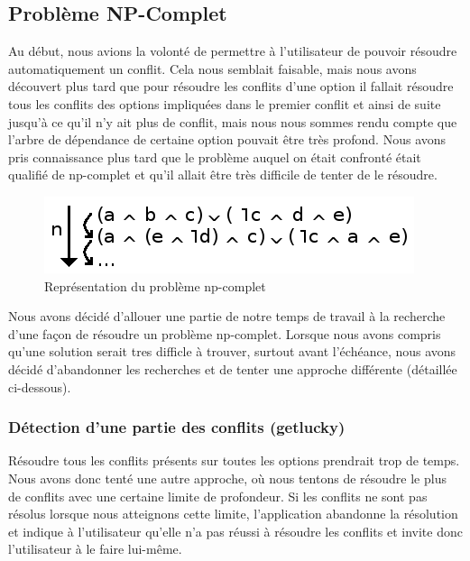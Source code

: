 \documentclass[16pts]{report}
\begin{document}
        \subsection{Problème NP-Complet}
        \label{sub:Problème NP-Complet}

Au début, nous avions la volonté de permettre à l'utilisateur de pouvoir
résoudre automatiquement un conflit. Cela nous semblait faisable, mais 
nous avons découvert plus tard que pour résoudre les conflits d'une option
il fallait résoudre tous les conflits des options impliquées dans le premier
conflit et ainsi de suite jusqu'à ce qu'il n'y ait plus de conflit, mais nous 
nous sommes rendu compte que l'arbre de dépendance de certaine option pouvait être 
très profond. Nous avons pris connaissance plus tard que le problème auquel on 
était confronté était qualifié de np-complet et qu'il allait être très difficile
de tenter de le résoudre. 

%




\begin{figure}[H]
	\includegraphics[scale=1]{./illustrations/np_complet.png}
	\centering
	\caption{Représentation du problème np-complet}
	\label{fig:np-complet}
\end{figure}

Nous avons décidé d'allouer une partie de notre temps de travail à la recherche
d'une façon de résoudre un problème np-complet. Lorsque nous avons compris 
qu'une solution serait tres difficle à trouver, surtout avant l'échéance, nous
avons décidé d'abandonner les recherches et de tenter une approche différente
(détaillée ci-dessous).


        \subsubsection{Détection d'une partie des conflits (getlucky)}
            \label{sub:Problème NP-Complet (getlucky)}

Résoudre tous les conflits présents sur toutes les options prendrait trop de temps.
Nous avons donc tenté une autre approche, où nous tentons de résoudre le plus 
de conflits avec une certaine limite de profondeur. Si les conflits ne sont pas
résolus lorsque nous atteignons cette limite, l'application abandonne la 
résolution et indique à l'utilisateur qu'elle n'a pas réussi à résoudre les 
conflits et invite donc l'utilisateur à le faire lui-même.\\
\end{document}
